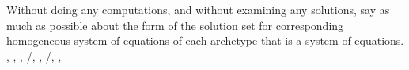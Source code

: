Without doing any computations, and without examining any solutions, say as much as possible about the form of the solution set for corresponding homogeneous system of equations of each archetype that is a system of equations.\newline\newline
{},
,
,
/,
,
/,
,
